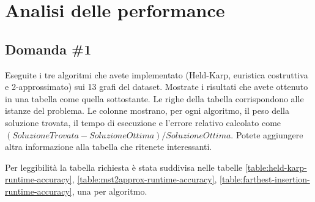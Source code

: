 \section{Analisi delle performance}
\label{cap:performance-analysis}

\subsection{Domanda \#1}

\begin{displayquote}
Eseguite i tre algoritmi che avete implementato (Held-Karp,
euristica costruttiva e 2-approssimato) sui 13 grafi del dataset.
Mostrate i risultati che avete ottenuto in una tabella come quella
sottostante. Le righe della tabella corrispondono alle istanze del
problema. Le colonne mostrano, per ogni algoritmo, il peso della
soluzione trovata, il tempo di esecuzione e l'errore relativo
calcolato come $(SoluzioneTrovata-SoluzioneOttima)/SoluzioneOttima$.
Potete aggiungere altra informazione alla tabella che ritenete
interessanti.
\end{displayquote}

Per leggibilità la tabella richiesta è stata suddivisa nelle tabelle
\ref{table:held-karp-runtime-accuracy},
\ref{table:mst2approx-runtime-accuracy},
\ref{table:farthest-insertion-runtime-accuracy},
una per algoritmo.

